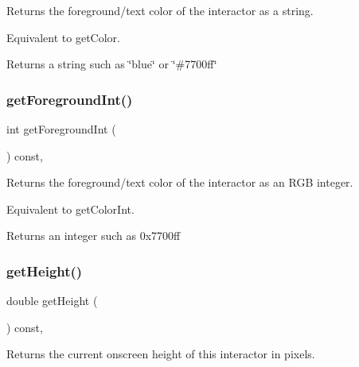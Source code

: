 Returns the foreground/text color of the interactor as a string. 

Equivalent to get\+Color. \begin{DoxyReturn}{Returns}
a string such as \char`\"{}blue\char`\"{} or \char`\"{}\#7700ff\char`\"{} 
\end{DoxyReturn}
\mbox{\label{classsgl_1_1GInteractor_ac3b12ab385a6ef9ae90fc879860ba726}} 
\subsubsection{\texorpdfstring{get\+Foreground\+Int()}{getForegroundInt()}}
{\footnotesize\ttfamily int get\+Foreground\+Int (\begin{DoxyParamCaption}{ }\end{DoxyParamCaption}) const\hspace{0.3cm}{\ttfamily [virtual]}, {\ttfamily [inherited]}}



Returns the foreground/text color of the interactor as an R\+GB integer. 

Equivalent to get\+Color\+Int. \begin{DoxyReturn}{Returns}
an integer such as 0x7700ff 
\end{DoxyReturn}
\mbox{\label{classsgl_1_1GInteractor_a1e7e353362434072875264cf95629f99}} 
\subsubsection{\texorpdfstring{get\+Height()}{getHeight()}}
{\footnotesize\ttfamily double get\+Height (\begin{DoxyParamCaption}{ }\end{DoxyParamCaption}) const\hspace{0.3cm}{\ttfamily [virtual]}, {\ttfamily [inherited]}}



Returns the current onscreen height of this interactor in pixels. 

\mbox{\label{classsgl_1_1GInteractor_aaed62a73004939a64da6f0eb9eb64d73}} 
